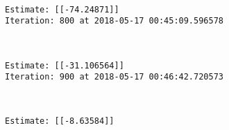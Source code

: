 \documentclass[11pt]{article}
\begin{document}
    \begin{center}
    \end{center}
    { \hspace*{\fill} \\}
    
    \begin{Verbatim}[commandchars=\\\{\}]
Estimate: [[-74.24871]]
Iteration: 800 at 2018-05-17 00:45:09.596578

    \end{Verbatim}

    \begin{center}
    \end{center}
    { \hspace*{\fill} \\}
    
    \begin{Verbatim}[commandchars=\\\{\}]
Estimate: [[-31.106564]]
Iteration: 900 at 2018-05-17 00:46:42.720573

    \end{Verbatim}

    \begin{center}
    \end{center}
    { \hspace*{\fill} \\}
    
    \begin{Verbatim}[commandchars=\\\{\}]
Estimate: [[-8.63584]]

    \end{Verbatim}


    
    
    
    
\end{document}
